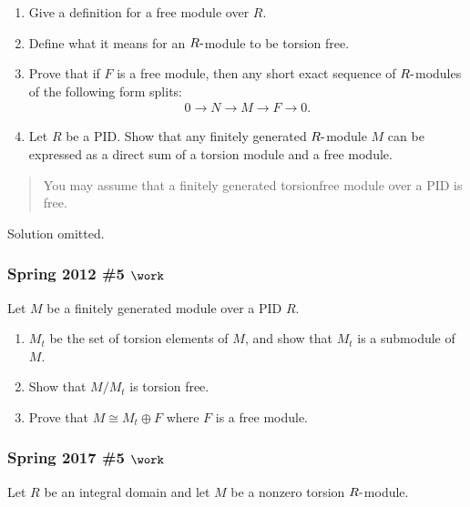 \begin{enumerate}
\def\labelenumi{\alph{enumi}.}
\item
  Give a definition for a free module over \(R\).
\item
  Define what it means for an \(R{\hbox{-}}\)module to be torsion free.
\item
  Prove that if \(F\) is a free module, then any short exact sequence of
  \(R{\hbox{-}}\)modules of the following form splits:
  \begin{align*}
  0 \to N \to M \to F \to 0
  .\end{align*}
\item
  Let \(R\) be a PID. Show that any finitely generated
  \(R{\hbox{-}}\)module \(M\) can be expressed as a direct sum of a
  torsion module and a free module.
\end{enumerate}

\begin{quote}
You may assume that a finitely generated torsionfree module over a PID
is free.
\end{quote}

Solution omitted.

\hypertarget{spring-2012-5-work}{%
\subsubsection{\texorpdfstring{Spring 2012 \#5
\(\work\)}{Spring 2012 \#5 \textbackslash work}}\label{spring-2012-5-work}}

Let \(M\) be a finitely generated module over a PID \(R\).

\begin{enumerate}
\def\labelenumi{\alph{enumi}.}
\item
  \(M_t\) be the set of torsion elements of \(M\), and show that \(M_t\)
  is a submodule of \(M\).
\item
  Show that \(M/M_t\) is torsion free.
\item
  Prove that \(M \cong M_t \oplus F\) where \(F\) is a free module.
\end{enumerate}

\hypertarget{spring-2017-5-work}{%
\subsubsection{\texorpdfstring{Spring 2017 \#5
\(\work\)}{Spring 2017 \#5 \textbackslash work}}\label{spring-2017-5-work}}

Let \(R\) be an integral domain and let \(M\) be a nonzero torsion
\(R{\hbox{-}}\)module.

